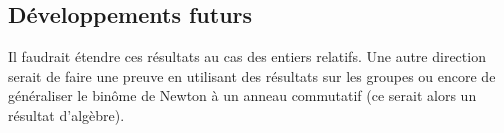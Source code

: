 \subsection{Développements futurs}

Il faudrait étendre ces résultats au cas des entiers relatifs. Une autre direction serait de faire une preuve en utilisant des résultats sur les groupes ou encore de généraliser le binôme de Newton à un anneau commutatif (ce serait alors un résultat d'algèbre).

